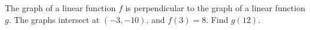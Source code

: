 The graph of a linear function $f$ is perpendicular to the graph of a linear function $g$. The graphs intersect at $(-3,-10)$, and $f(3)=8$. Find $g(12)$.
